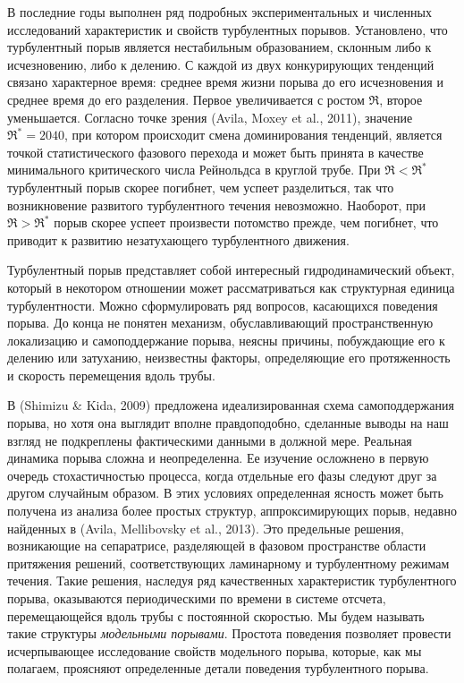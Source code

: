 В последние годы выполнен ряд подробных экспериментальных и численных исследований характеристик и свойств турбулентных порывов. Установлено, что турбулентный порыв является нестабильным образованием, склонным либо к исчезновению, либо к делению. С каждой из двух конкурирующих тенденций связано характерное время: среднее время жизни порыва до его исчезновения и среднее время до его разделения. Первое увеличивается с ростом $\Re$, второе уменьшается. Согласно точке зрения (Avila, Moxey et al., 2011), значение $\Re^*=2040$, при котором происходит смена доминирования тенденций, является точкой статистического фазового перехода и может быть принята в качестве минимального критического числа Рейнольдса в круглой трубе. При $\Re<\Re^*$ турбулентный порыв скорее погибнет, чем успеет разделиться, так что возникновение развитого турбулентного течения невозможно. Наоборот, при $\Re>\Re^*$ порыв скорее успеет произвести потомство прежде, чем погибнет, что приводит к развитию незатухающего турбулентного движения.

Турбулентный порыв представляет собой интересный гидродинамический объект, который в некотором отношении может рассматриваться как структурная единица турбулентности. Можно сформулировать ряд вопросов, касающихся поведения порыва. До конца не понятен механизм, обуславливающий пространственную локализацию и самоподдержание порыва, неясны причины, побуждающие его к делению или затуханию, неизвестны факторы, определяющие его протяженность и скорость перемещения вдоль трубы.

В (Shimizu \& Kida, 2009) предложена идеализированная схема самоподдержания порыва, но хотя она выглядит вполне правдоподобно, сделанные выводы на наш взгляд не подкреплены фактическими данными в должной мере. Реальная динамика порыва сложна и неопределенна. Ее изучение осложнено в первую очередь стохастичностью процесса, когда отдельные его фазы следуют друг за другом случайным образом. В этих условиях определенная ясность может быть получена из анализа более простых структур, аппроксимирующих порыв, недавно найденных в (Avila, Mellibovsky et al., 2013). Это предельные решения, возникающие на сепаратрисе, разделяющей в фазовом пространстве области притяжения решений, соответствующих ламинарному и турбулентному режимам течения. Такие решения, наследуя ряд качественных характеристик турбулентного порыва, оказываются периодическими по времени в системе отсчета, перемещающейся вдоль трубы с постоянной скоростью. Мы будем называть такие структуры {\it модельными порывами}. Простота поведения позволяет провести исчерпывающее исследование свойств модельного порыва, которые, как мы полагаем, проясняют определенные детали поведения турбулентного порыва. 

